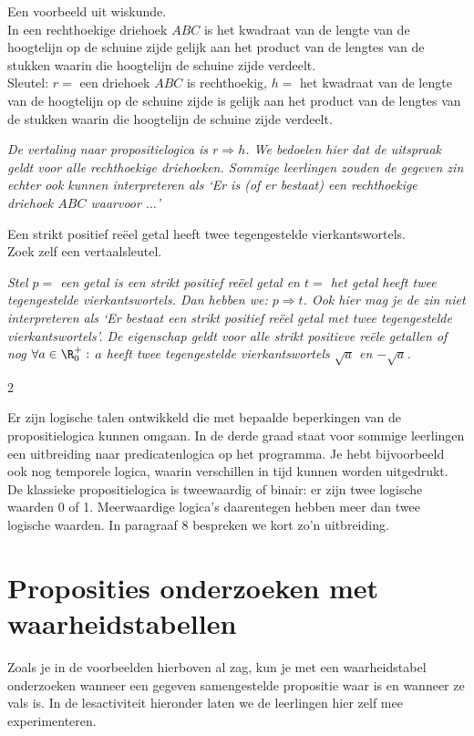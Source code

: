 \begin{werktekstoef}
\item{Een voorbeeld uit wiskunde.\\ In een rechthoekige driehoek $ABC$ is het kwadraat van de lengte van de hoogtelijn op de schuine zijde gelijk aan het product van de lengtes van de stukken waarin die hoogtelijn de schuine zijde verdeelt.\\ Sleutel: $r=$ een driehoek $ABC$ is rechthoekig, $h=$ het kwadraat van de lengte van de hoogtelijn op de schuine zijde is gelijk aan het product van de lengtes van de stukken waarin die hoogtelijn de schuine zijde verdeelt. }

\emph{De vertaling naar propositielogica is $r\Rightarrow h$. We bedoelen hier dat de uitspraak geldt voor alle rechthoekige driehoeken. Sommige leerlingen zouden de gegeven zin echter ook kunnen interpreteren als `Er is (of er bestaat) een rechthoekige driehoek $ABC$ waarvoor $\ldots$'}

\item{Een strikt positief reëel getal heeft twee tegengestelde vierkantswortels.\\ Zoek zelf een vertaalsleutel.}

\emph{Stel $p=$ een getal is een strikt positief reëel getal en $t=$ het getal heeft twee tegengestelde vierkantswortels. Dan hebben we: $p\Rightarrow t$. Ook hier mag je de zin niet interpreteren als `Er bestaat een strikt positief reëel getal met twee tegengestelde vierkantswortels'. De eigenschap geldt voor alle strikt positieve reële getallen of nog $\forall a \in \R_0^+:$ $a$ heeft twee tegengestelde vierkantswortels $\sqrt{a}$ en $-\sqrt{a}$.}


\end{werktekstoef}  
\eindewerktekst

\begin{multicols}{2}

Er zijn logische talen ontwikkeld die met bepaalde beperkingen van de propositielogica kunnen omgaan. In de derde graad staat voor sommige leerlingen een uitbreiding naar predicatenlogica op het programma. Je hebt bijvoorbeeld ook nog temporele logica, waarin verschillen in tijd kunnen worden uitgedrukt. De klassieke propositielogica is tweewaardig of binair: er zijn twee logische waarden 0 of 1. Meerwaardige logica's daarentegen hebben meer dan twee logische waarden. In paragraaf 8 bespreken we kort zo'n uitbreiding.


\section{Proposities onderzoeken met waarheidstabellen}

Zoals je in de voorbeelden hierboven al zag, kun je met een waarheidstabel onderzoeken wanneer een gegeven samengestelde propositie waar is en wanneer ze vals is. In de lesactiviteit hieronder laten we de leerlingen hier zelf mee experimenteren.

\end{multicols}
\newpage

